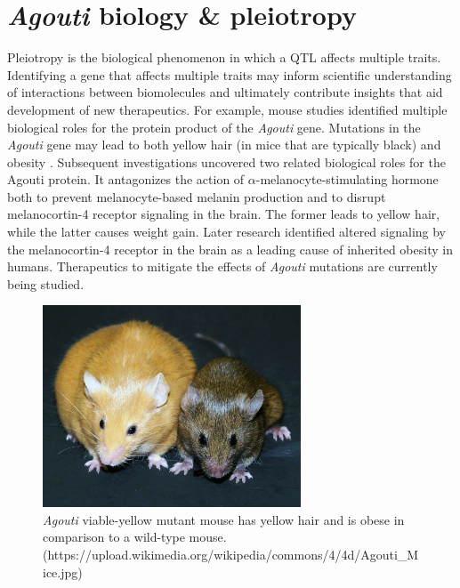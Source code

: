 \documentclass[oneside]{book}\usepackage[]{graphicx}\usepackage[]{color}
\begin{document}
\section{\emph{Agouti} biology \& pleiotropy}
Pleiotropy is the biological phenomenon in which a QTL affects multiple traits. 
Identifying a gene that affects multiple traits may inform scientific understanding of
interactions between biomolecules and ultimately contribute insights that aid development
of new therapeutics. 
For example, mouse studies identified multiple biological roles for the protein product of 
the \emph{Agouti} gene. Mutations in the \emph{Agouti} gene may lead to both 
yellow hair (in mice that are typically black) and obesity \citep{attie2017how}.
Subsequent investigations uncovered two related biological roles for the Agouti protein.
It antagonizes the action of $\alpha$-melanocyte-stimulating hormone both to
prevent melanocyte-based melanin production and to disrupt melanocortin-4
receptor signaling in the brain.
The former leads to yellow hair, while the latter causes weight gain.
Later research identified altered signaling by the melanocortin-4 receptor in
the brain as a leading cause of inherited obesity in humans.
Therapeutics to mitigate the effects of \emph{Agouti} mutations are currently being studied.


\begin{figure}
\includegraphics[height=6cm]{figs/Agouti.jpg}
\caption{\emph{Agouti} viable-yellow mutant mouse has yellow hair and is obese in comparison to a wild-type mouse. \tiny{(https://upload.wikimedia.org/wikipedia/commons/4/4d/Agouti\_Mice.jpg)}}
\label{fig:agouti}
\end{figure}







\end{document}
